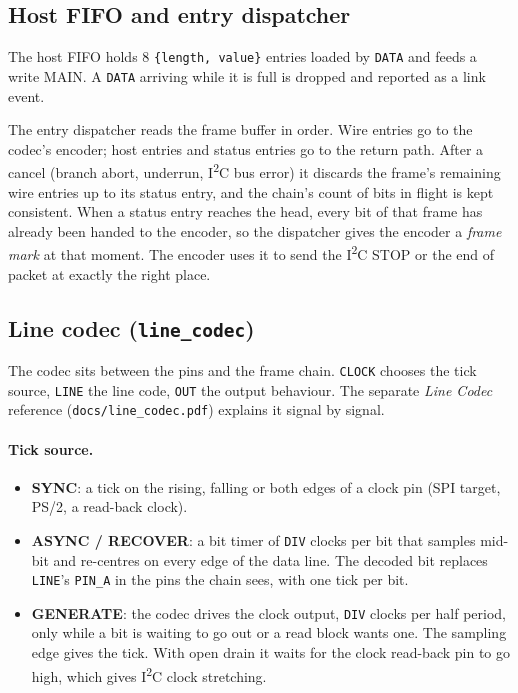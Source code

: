 \documentclass[11pt,a4paper]{article}
\newcommand{\sig}[1]{\texttt{#1}}
\begin{document}
\subsection{Host FIFO and entry dispatcher}

The host FIFO holds 8 \texttt{\{length, value\}} entries loaded by \sig{DATA} and feeds a write MAIN. A \sig{DATA} arriving while it is full is dropped and reported as a link event.

The entry dispatcher reads the frame buffer in order. Wire entries go to the codec's encoder; host entries and status entries go to the return path. After a cancel (branch abort, underrun, I\textsuperscript{2}C bus error) it discards the frame's remaining wire entries up to its status entry, and the chain's count of bits in flight is kept consistent. When a status entry reaches the head, every bit of that frame has already been handed to the encoder, so the dispatcher gives the encoder a \emph{frame mark} at that moment. The encoder uses it to send the I\textsuperscript{2}C STOP or the end of packet at exactly the right place.

\subsection{Line codec (\sig{line\_codec})}

The codec sits between the pins and the frame chain. \sig{CLOCK} chooses the tick source, \sig{LINE} the line code, \sig{OUT} the output behaviour. The separate \emph{Line Codec} reference (\sig{docs/line\_codec.pdf}) explains it signal by signal.

\paragraph{Tick source.}
\begin{itemize}
\item \textbf{SYNC}: a tick on the rising, falling or both edges of a clock pin (SPI target, PS/2, a read-back clock).
\item \textbf{ASYNC / RECOVER}: a bit timer of \sig{DIV} clocks per bit that samples mid-bit and re-centres on every edge of the data line. The decoded bit replaces \sig{LINE}'s \sig{PIN\_A} in the pins the chain sees, with one tick per bit.
\item \textbf{GENERATE}: the codec drives the clock output, \sig{DIV} clocks per half period, only while a bit is waiting to go out or a read block wants one. The sampling edge gives the tick. With open drain it waits for the clock read-back pin to go high, which gives I\textsuperscript{2}C clock stretching.
\end{itemize}
\end{document}
